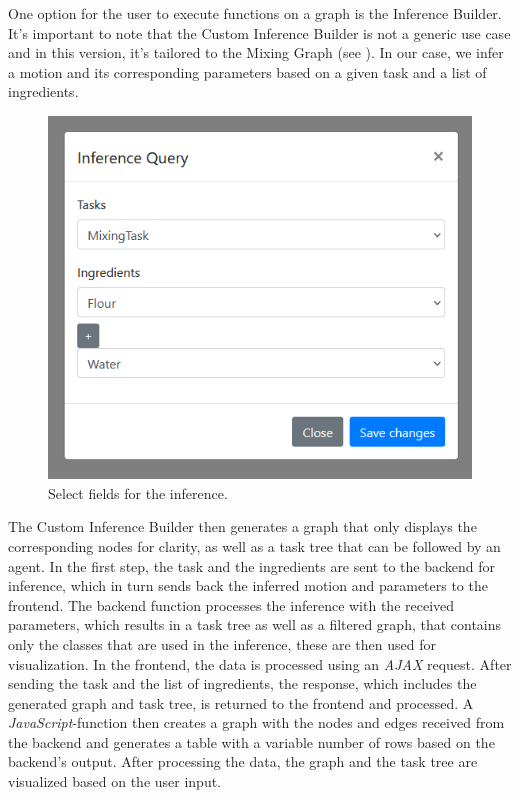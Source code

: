 One option for the user to execute functions on a graph is the Inference Builder. 
It's important to note that the Custom Inference Builder is not a generic use case and in this version, it's tailored to the Mixing Graph (see ). 
In our case, we infer a motion and its corresponding parameters based on a given task and a list of ingredients. 
\begin{figure}[H]
    \includegraphics[scale=0.45]{Graphics/inference_user_input.png}
    \caption{Select fields for the inference.}
\end{figure}
The Custom Inference Builder then generates a graph that only displays the corresponding nodes for clarity, as well as a task tree that can be followed by an agent.
In the first step, the task and the ingredients are sent to the backend for inference, which in turn sends back the inferred motion and parameters to the frontend.
The backend function processes the inference with the received parameters, which results in a task tree as well as a filtered graph, that contains only the classes that are used in the inference, these are then used for visualization.
In the frontend, the data is processed using an \textit{AJAX} request. After sending the task and the list of ingredients, the response, which includes the generated graph and task tree, is returned to the frontend and processed. A \textit{JavaScript}-function then creates a graph with the nodes and edges received from the backend and generates a table with a variable number of rows based on the backend's output.
After processing the data, the graph and the task tree are visualized based on the user input.

